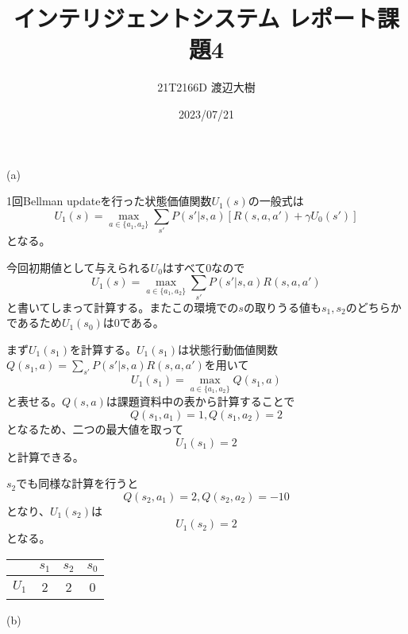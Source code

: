 \documentclass[a4paper,11pt,dvipdfmx]{jsarticle}
\begin{document}
\title{インテリジェントシステム レポート課題4}
\author{21T2166D 渡辺大樹}
\date{2023/07/21}
\maketitle

\section{}
(a)

1回Bellman updateを行った状態価値関数$U_1(s)$の一般式は
\[U_1(s)=\max_{a\in\{a_1,a_2\}}\sum_{s'}P(s'|s,a)[R(s,a,a')+\gamma U_0(s')]\]
となる。

今回初期値として与えられる$U_0$はすべて0なので
\[U_1(s)=\max_{a\in\{a_1,a_2\}}\sum_{s'}P(s'|s,a)R(s,a,a')\]
と書いてしまって計算する。またこの環境での$s$の取りうる値も$s_1,s_2$のどちらかであるため$U_1(s_0)$は0である。

まず$U_1(s_1)$を計算する。$U_1(s_1)$は状態行動価値関数$Q(s_1,a)=\sum_{s'}P(s'|s,a)R(s,a,a')$を用いて
\[U_1(s_1)=\max_{a\in\{a_1,a_2\}}Q(s_1,a)\]
と表せる。$Q(s,a)$は課題資料中の表から計算することで
\[Q(s_1,a_1)=1,Q(s_1,a_2)=2\]
となるため、二つの最大値を取って
\[U_1(s_1)=2\]
と計算できる。

$s_2$でも同様な計算を行うと
\[Q(s_2,a_1)=2,Q(s_2,a_2)=-10\]
となり、$U_1(s_2)$は
\[U_1(s_2)=2\]
となる。

\begin{center}
    \begin{tabular}[h]{|c|c|c|c|} \hline
              & $s_1$ & $s_2$ & $s_0$ \\ \hline
        $U_1$ &   2   &   2   &   0   \\ \hline
    \end{tabular}
\end{center}

(b)
\end{document}
